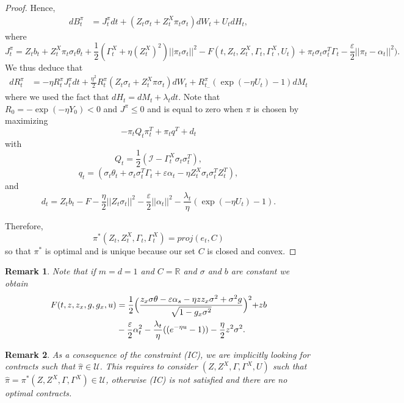 \documentclass[11pt,a4paper]{article}
\theoremstyle{thmstyleone}%
\theoremstyle{thmstyletwo}%
\newtheorem{remark}{Remark}%
\theoremstyle{thmstylethree}%
\begin{document}
\begin{proof}
Hence,
    \begin{align*}
        dB^\pi_t&=J^\pi_t dt+ (Z_t \sigma_t + Z^X_t \pi_t \sigma_t)dW_t+ U_t dH_t,
    \end{align*}
where 
\[J^\pi_t= Z_t b_t + Z^X_t \pi_t \sigma_t \theta_t + \frac{1}{2}(\Gamma^X_t + \eta(Z^X_t)^2)|| \pi_t \sigma_t||^2 - F(t, Z_t, Z_t^X, \Gamma_t, \Gamma_t^X,U_t)  + \pi_t \sigma_t \sigma^T_t \Gamma_t - \frac{\varepsilon}{2}|| \pi_t - \alpha_t||^2).  \]
We thus deduce that
    \begin{align*}
        dR^\pi_t&= -\eta R^\pi_t  J^\pi_t dt+ \frac{\eta^2}{2} R^\pi_t (Z_t \sigma_t + Z^X_t \pi \sigma_t)dW_t+ R^\pi_{t_{-}} (\exp{(-\eta U_t) - 1}) dM_t
    \end{align*}
    where we used the fact that $dH_t = dM_t + \lambda_t dt$. Note that $R_0 = -\exp{(-\eta Y_0)} < 0$ and $J^\pi\leq 0$ and is equal to zero when $\pi$ is chosen by maximizing
    \[
        -\pi_t Q_t \pi_t^T + \pi_t q^T + d_t
    \]
    with
    \[
        Q_t = \frac{1}{2}(\mathcal{I} - \Gamma^X_t \sigma_t \sigma^T_t ),
    \]
    \[
        q_t = (\sigma_t \theta_t + \sigma_t \sigma^T_t \Gamma_t + \varepsilon \alpha_t - \eta Z_t^X  \sigma_t \sigma^T_t Z^T_t),
    \]
    and
    \[
        d_t = Z_t b_t - F - \frac{\eta}{2} || Z_t \sigma_t ||^2 - \frac{\varepsilon}{2} ||\alpha_t||^2 - \frac{\lambda_t}{\eta} (\exp{(-\eta U_t) - 1}).
    \]


  Therefore,
    \[
        \pi^*(Z_t, Z_t^X, \Gamma_t, \Gamma^X_t) = proj(e_t, C)
    \]
    so that $\pi^*$ is optimal and is unique because our set $C$ is closed and convex.
    \end{proof}


\begin{remark}
    Note that if $m=d=1$ and $C=\mathbb R$ and $\sigma$ and $b$ are constant we obtain 
    \begin{align*}
        F(t, z, z_x, g, g_x, u) 
        &= \frac{1}{2} \Bigl(\frac{z_x\sigma \theta - \varepsilon \alpha_s -\eta z z_x \sigma^2 + \sigma^2 g}{\sqrt{1 - g_x \sigma^2}}\Bigl)^2 + zb \\
        &- \frac{\varepsilon}{2}\alpha_t^2 - \frac{\lambda_t}{\eta}((e^{-\eta u} - 1)) - \frac{\eta}{2} z^2 \sigma^2.
    \end{align*}
\end{remark}
\begin{remark}
As a consequence of the constraint (IC), we are implicitly looking for contracts such that  $\hat\pi\in \mathcal U$. This requires to consider $(Z,Z^X,\Gamma,\Gamma^X,U)$ such that $\hat\pi=\pi^*(Z, Z^X, \Gamma, \Gamma^X)\in \mathcal U$, otherwise (IC) is not satisfied and there are no optimal contracts. 
\end{remark}
\end{document}
